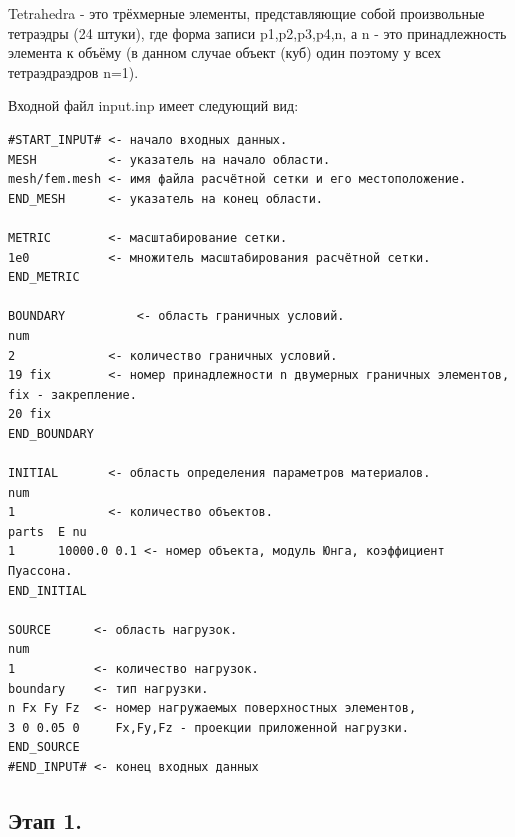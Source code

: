 \documentclass[a4paper,12pt]{article}
\begin{document}
Tetrahedra - это трёхмерные элементы, представляющие собой произвольные тетраэдры (24 штуки), где форма записи p1,p2,p3,p4,n, а n - это принадлежность элемента к объёму (в данном случае объект (куб) один поэтому у всех тетраэдраэдров n=1).


Входной файл input.inp имеет следующий вид:
\begin{small}
\begin{verbatim}	
#START_INPUT# <- начало входных данных.
MESH          <- указатель на начало области.				
mesh/fem.mesh <- имя файла расчётной сетки и его местоположение.
END_MESH      <- указатель на конец области.				

METRIC        <- масштабирование сетки.	
1e0           <- множитель масштабирования расчётной сетки.		
END_METRIC

BOUNDARY		  <- область граничных условий.		
num           		 
2             <- количество граничных условий.	
19 fix        <- номер принадлежности n двумерных граничных элементов, fix - закрепление.
20 fix
END_BOUNDARY

INITIAL		  <- область определения параметров материалов.	
num
1			  <- количество объектов.	
parts  E nu
1      10000.0 0.1 <- номер объекта, модуль Юнга, коэффициент Пуассона.	
END_INITIAL

SOURCE      <- область нагрузок.	
num
1           <- количество нагрузок.			
boundary    <- тип нагрузки.	
n Fx Fy Fz  <- номер нагружаемых поверхностных элементов,  	
3 0 0.05 0     Fx,Fy,Fz - проекции приложенной нагрузки.
END_SOURCE
#END_INPUT# <- конец входных данных
\end{verbatim}
\end{small} 

 	\subsection{Этап 1.}
 	
\end{document}
